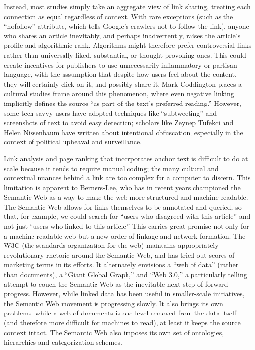 Instead, most studies simply take an aggregate view of link sharing, treating each connection as equal regardless of context. With rare exceptions (such as the ``nofollow'' attribute, which tells Google's crawlers not to follow the link), anyone who shares an article inevitably, and perhaps inadvertently, raises the article's profile and algorithmic rank. Algorithms might therefore prefer controversial links rather than universally liked, substantial, or thought-provoking ones. This could create incentives for publishers to use unnecessarily inflammatory or partisan language, with the assumption that despite how users feel about the content, they will certainly click on it, and possibly share it. Mark Coddington places a cultural studies frame around this phenomenon, where even negative linking implicitly defines the source ``as part of the text's preferred reading.''\autocite{coddington_building_2012} However, some tech-savvy users have adopted techniques like ``subtweeting'' and screenshots of text to avoid easy detection; scholars like Zeynep Tufekci and Helen Nissenbaum have written about intentional obfuscation, especially in the context of political upheaval and surveillance.\autocite{tufekci_big_2014,zuckerman_helen_2014}

Link analysis and page ranking that incorporates anchor text is difficult to do at scale because it tends to require manual coding; the many cultural and contextual nuances behind a link are too complex for a computer to discern. This limitation is apparent to Berners-Lee, who has in recent years championed the Semantic Web as a way to make the web more structured and machine-readable. The Semantic Web allows for links themselves to be annotated and queried, so that, for example, we could search for ``users who disagreed with this article'' and not just ``users who linked to this article.''\autocite[FIND PAGE]{berners-lee_weaving_2000} This carries great promise not only for a machine-readable web but a new order of linkage and network formation. The W3C (the standards organization for the web) maintains appropriately revolutionary rhetoric around the Semantic Web, and has tried out scores of marketing terms in its efforts. It alternately envisions a ``web of data'' (rather than documents), a ``Giant Global Graph,'' and ``Web 3.0,'' a particularly telling attempt to couch the Semantic Web as the inevitable next step of forward progress. However, while linked data has been useful in smaller-scale initiatives, the Semantic Web movement is progressing slowly. It also brings its own problems; while a web of documents is one level removed from the data itself (and therefore more difficult for machines to read), at least it keeps the source context intact. The Semantic Web also imposes its own set of ontologies, hierarchies and categorization schemes.

